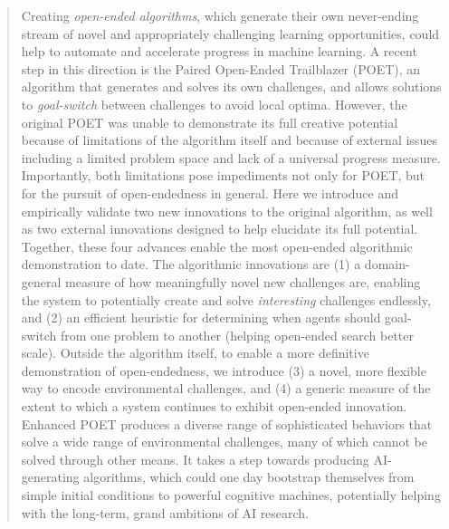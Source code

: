 \documentclass{article}
\newcommand{\jc}[1]{\comments{\textcolor{deepForestGreen}{[JC: #1]}}}
\newcommand{\removed}[1]{\comments{\textcolor{gray}{\sout{#1}}}}
\newcommand{\comments}[1]{#1} %
\begin{document}
\printAffiliationsAndNotice{\icmlEqualContribution} %

\begin{abstract}
Creating \emph{open-ended algorithms}, which generate their own never-ending stream of novel and appropriately challenging learning opportunities, could help to automate and accelerate progress in machine learning. 
A recent step in this direction is the Paired Open-Ended Trailblazer (POET), an algorithm that generates and solves its own challenges, and allows solutions to \emph{goal-switch} between challenges to avoid local optima. However, the original POET was unable to demonstrate its full creative potential because of limitations of the algorithm itself and because of external issues including a limited problem space and lack of a universal progress measure.
Importantly, both limitations pose impediments not only for POET, but for the pursuit of open-endedness in general.
Here we introduce and empirically validate two new innovations to the original algorithm, as well as two external innovations designed to help elucidate its full potential.  Together, these four advances enable the most open-ended algorithmic demonstration to date. 
The algorithmic innovations are (1) a domain-general measure of how meaningfully novel new challenges are,
 enabling the system to potentially create and solve \emph{interesting} challenges endlessly, and (2) an efficient heuristic for determining when agents should goal-switch from one problem to another (helping open-ended search better scale).
 Outside the algorithm itself, to enable a more definitive demonstration of open-endedness, we introduce
 (3) a novel, more flexible way to encode environmental challenges, and (4) a generic measure of the extent to which a system continues to exhibit open-ended innovation. Enhanced POET produces a diverse range of sophisticated behaviors that solve a wide range of environmental challenges, many of which cannot be solved through other means. 
 It takes a step towards producing AI-generating algorithms, which could one day bootstrap themselves from simple initial conditions to powerful cognitive machines, potentially helping with the long-term, grand ambitions of AI research.
\end{abstract}
\end{document}
